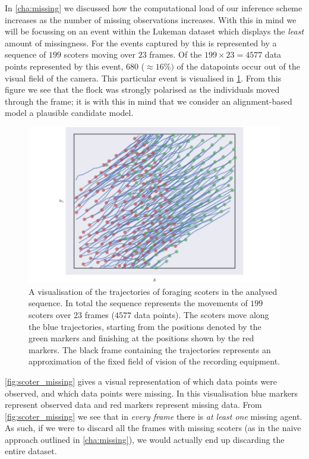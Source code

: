 In \cref{cha:missing} we discussed how the computational load of our inference
scheme increases as the number of missing observations increases. With this in
mind we will be focussing on an event within the Lukeman dataset which displays
the \emph{least} amount of missingness. For the events captured by
\textcite{lukeman10} this is represented by a sequence of $199$ scoters moving
over $23$ frames. Of the $199\times23=4577$ data points represented by this
event, $680$ ($\approx16\%)$ of the datapoints occur out of the visual field of
the camera. This particular event is visualised in \cref{fig:scoter_traj}. From
this figure we see that the flock was strongly polarised as the individuals
moved through the frame; it is with this in mind that we consider an
alignment-based model a plausible candidate model.

\begin{figure}[tb]
  \includegraphics{data_00_traj.pdf}
  \caption{A visualisation of the trajectories of foraging scoters in the
      analysed sequence. In total the sequence represents the movements of
      $199$ scoters over $23$ frames ($4577$ data points). The scoters move
      along the blue trajectories, starting from the positions denoted by the
      green markers and finishing at the positions shown by the red markers.
      The black frame containing the trajectories represents an approximation
      of the fixed field of vision of the recording equipment.}
  \label{fig:scoter_traj}
\end{figure}

\cref{fig:scoter_missing} gives a visual representation of which data points
were observed, and which data points were missing. In this visualisation blue
markers represent observed data and red markers represent missing data. From
\cref{fig:scoter_missing} we see that in \emph{every frame} there is \emph{at
least one} missing agent. As such, if we were to discard all the frames with
missing scoters (as in the naive approach outlined in \cref{cha:missing}), we
would actually end up discarding the entire dataset.


